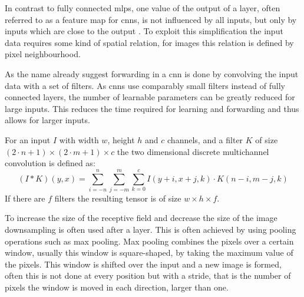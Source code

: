 In contrast to fully connected \ac{mlp}s, one value of the output of a layer, often referred to as a feature map for \ac{cnn}s, is not influenced by all inputs, but only by inputs which are close to the output \cite{lenet}. 
To exploit this simplification the input data requires some kind of spatial relation, for images this relation is defined by pixel neighbourhood.

As the name already suggest forwarding in a \ac{cnn} is done by convolving the input data with a set of filters. 
As \ac{cnn}s use comparably small filters instead of fully connected layers, the number of learnable parameters can be greatly reduced for large inputs. 
This reduces the time required for learning and forwarding and thus allows for larger inputs.

For an input $I$ with width $w$, height $h$ and $c$ channels, and a filter $K$ of size $(2 \cdot n + 1) \times (2 \cdot m + 1) \times c$ the two dimensional discrete multichannel convolution is defined as:
\begin{equation}
    (I * K)(y,x) = \sum_{i=-n}^n \sum_{j=-m}^m \sum_{k=0}^c I(y+i,x+j,k) \cdot K(n-i,m-j,k) 
\end{equation}
If there are $f$ filters the resulting tensor is of size $w \times h \times f$.

To increase the size of the receptive field and decrease the size of the image downsampling is often used after a layer. 
This is often achieved by using pooling operations \cite{scherer2010} such as max pooling. 
Max pooling combines the pixels over a certain window, usually this window is square-shaped, by taking the maximum value of the pixels. 
This window is shifted over the input and a new image is formed, often this is not done at every position but with a stride, that is the number of pixels the window is moved in each direction, larger than one.

